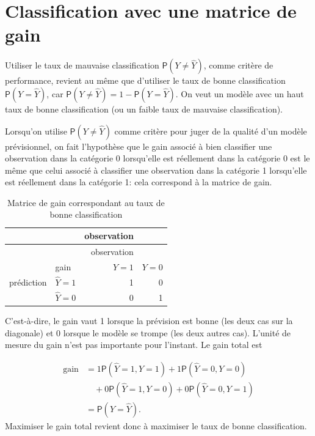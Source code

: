 \documentclass[
  11pt,
  letterpaper,
]{book}
\theoremstyle{definition}
\theoremstyle{definition}
\theoremstyle{definition}
\theoremstyle{definition}
\theoremstyle{remark}
\begin{document}
\hypertarget{classification-avec-une-matrice-de-gain}{%
\section{Classification avec une matrice de gain}\label{classification-avec-une-matrice-de-gain}}

Utiliser le taux de mauvaise classification \({\mathsf P}\left(Y \neq \widehat{Y}\right)\), comme critère de performance, revient au même que d'utiliser le taux de bonne classification \({\mathsf P}\left(Y=\widehat{Y}\right)\), car \({\mathsf P}\left(Y \neq \widehat{Y}\right) = 1-{\mathsf P}\left(Y=\widehat{Y}\right)\). On veut un modèle avec un haut taux de bonne classification (ou un faible taux de mauvaise classification).

Lorsqu'on utilise \({\mathsf P}\left(Y \neq \widehat{Y}\right)\) comme critère pour juger de la qualité d'un modèle prévisionnel, on fait l'hypothèse que le gain associé à bien classifier une observation dans la catégorie 0 lorsqu'elle est réellement dans la catégorie 0 est le même que celui associé à classifier une observation dans la catégorie 1 lorsqu'elle est réellement dans la catégorie 1: cela correspond à la matrice de gain.

\begin{longtable}[]{@{}llrr@{}}
\caption{\label{tab:03-gain1} Matrice de gain correspondant au taux de bonne classification}\tabularnewline
\toprule
& & observation & \\
\midrule
\endfirsthead
\toprule
& & observation & \\
\midrule
\endhead
& gain & \(Y=1\) & \(Y=0\) \\
prédiction & \(\widehat{Y}=1\) & 1 & 0 \\
& \(\widehat{Y}=0\) & 0 & 1 \\
\bottomrule
\end{longtable}

C'est-à-dire, le gain vaut 1 lorsque la prévision est bonne (les deux cas sur la diagonale) et 0 lorsque le modèle se trompe (les deux autres cas). L'unité de mesure du gain n'est pas importante pour l'instant. Le gain total est

\begin{align*}
\text{gain} &= 1 {\mathsf P}\left(\widehat{Y}=1, Y=1\right) + 1 {\mathsf P}\left(\widehat{Y}=0, Y=0\right) 
\\ &\quad + 0 {\mathsf P}\left(\widehat{Y}=1, Y=0\right)  + 0 {\mathsf P}\left(\widehat{Y}=0, Y=1\right)
\\& = {\mathsf P}\left(Y = \widehat{Y}\right).
\end{align*}
Maximiser le gain total revient donc à maximiser le taux de bonne classification.
\end{document}
